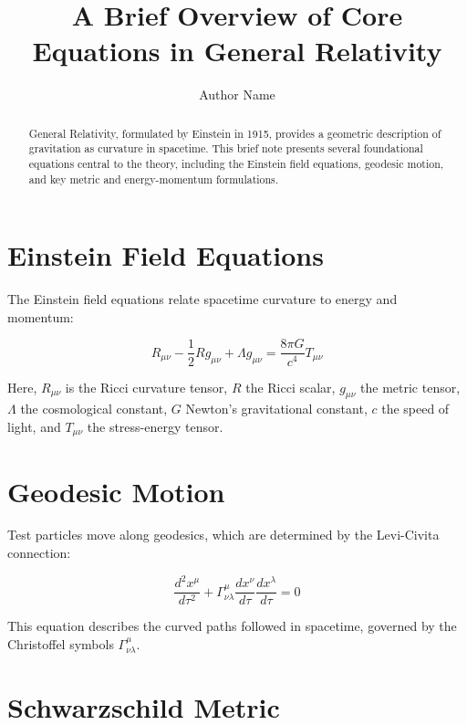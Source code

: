 \documentclass[12pt]{article}
\title{\textbf{A Brief Overview of Core Equations in General Relativity}}
\author[1]{Author Name}
\affil[1]{\small Department of Theoretical Physics, University of Spacetime Geometry}
\date{}
\begin{document}
\maketitle

\begin{abstract}
General Relativity, formulated by Einstein in 1915, provides a geometric description of gravitation as curvature in spacetime. This brief note presents several foundational equations central to the theory, including the Einstein field equations, geodesic motion, and key metric and energy-momentum formulations.
\end{abstract}

\section{Einstein Field Equations}

The Einstein field equations relate spacetime curvature to energy and momentum:

\begin{equation}
R_{\mu \nu} - \frac{1}{2} R g_{\mu \nu} + \Lambda g_{\mu \nu} = \frac{8 \pi G}{c^4} T_{\mu \nu}
\end{equation}

Here, \( R_{\mu \nu} \) is the Ricci curvature tensor, \( R \) the Ricci scalar, \( g_{\mu \nu} \) the metric tensor, \( \Lambda \) the cosmological constant, \( G \) Newton’s gravitational constant, \( c \) the speed of light, and \( T_{\mu \nu} \) the stress-energy tensor.

\section{Geodesic Motion}

Test particles move along geodesics, which are determined by the Levi-Civita connection:

\begin{equation}
\frac{d^2 x^\mu}{d \tau^2} + \Gamma^\mu_{\nu \lambda} \frac{d x^\nu}{d \tau} \frac{d x^\lambda}{d \tau} = 0
\end{equation}

This equation describes the curved paths followed in spacetime, governed by the Christoffel symbols \( \Gamma^\mu_{\nu \lambda} \).

\section{Schwarzschild Metric}
\end{document}
